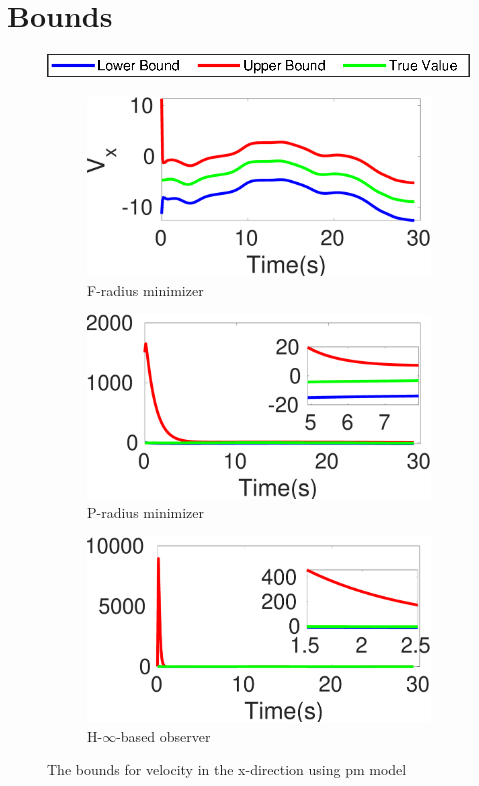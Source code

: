 \section{Bounds}
\begin{figure}[h]
\centering \includegraphics[scale=0.8]{figures/legend}\\
\begin{subfigure}{0.32\textwidth}
\centering
\includegraphics[width=\linewidth]{figures/sm}\caption{F-radius minimizer}
\end{subfigure}
\begin{subfigure}{0.32\linewidth}
\centering
\includegraphics[width=\linewidth]{figures/prad}\caption{P-radius minimizer}
\end{subfigure}
\begin{subfigure}{0.32\linewidth}
\centering
\includegraphics[width=\linewidth]{figures/hinf}\caption{H-$\infty$-based observer}
\end{subfigure}
\caption{The bounds for velocity in the x-direction using pm model}
\label{fig:bound}
\end{figure}
